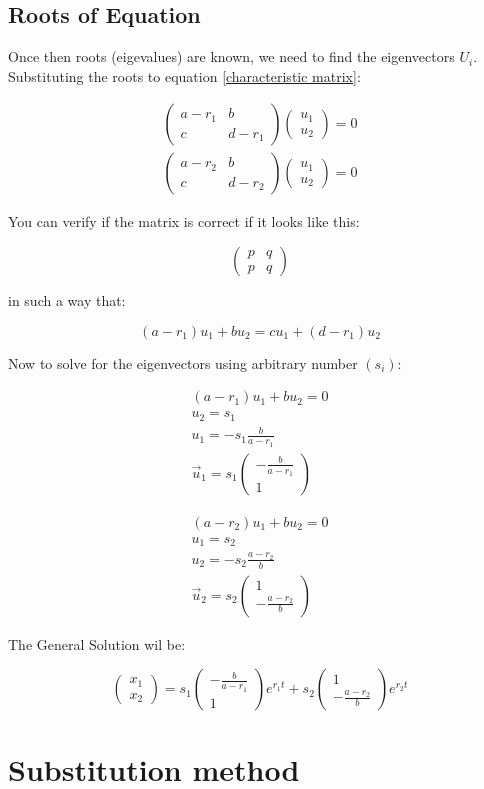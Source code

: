 \documentclass[12pt,letterpaper]{article}
\newcommand{\vectors}[2]{
	\begin{pmatrix}
		#1 \\ #2
	\end{pmatrix}
}
\newcommand{\smatrix}[4]{
	\begin{pmatrix}
		#1 & #2 \\ #3 & #4
	\end{pmatrix}
}
\begin{document}
		
		\subsection{Roots of Equation}

			Once then roots (eigevalues) are known, we need to find the eigenvectors $U_i$. Substituting the roots to equation \ref{characteristic matrix}:

			\begin{align*}
				\smatrix{a-r_1}{b}{c}{d-r_1} \vectors{u_1}{u_2} = 0 \\ 
				\smatrix{a-r_2}{b}{c}{d-r_2} \vectors{u_1}{u_2} = 0 
			\end{align*}

			You can verify if the matrix is correct if it looks like this:

			\begin{equation*}
				\smatrix{p}{q}{p}{q}
			\end{equation*}

			in such a way that:

			\begin{equation*}
				(a-r_1) u_1 + b u_2 = c u_1 + (d-r_1) u_2
			\end{equation*}

			Now to solve for the eigenvectors using arbitrary number $(s_i)$:

			\begin{align*}
				(a-r_1) u_1 + b u_2 = 0 \\
				u_2 = s_1 \\
				u_1  = -s_1 \frac{b}{a-r_1} \\
				\vec{u}_1 = s_1 \vectors{-\frac{b}{a-r_1}}{1}
			\end{align*}

			\begin{align*}
				(a-r_2) u_1 + b u_2 = 0 \\
				u_1 = s_2 \\
				u_2  = -s_2 \frac{a-r_2}{b} \\
				\vec{u}_2 = s_2 \vectors{1}{-\frac{a-r_2}{b}}
			\end{align*}

			The General Solution wil be:

			\begin{equation}
				\vectors{x_1}{x_2} = s_1 \vectors{-\frac{b}{a-r_1}}{1} e^{r_1 t} + s_2 \vectors{1}{-\frac{a-r_2}{b}} e^{r_2 t}
			\end{equation}

	\section{Substitution method}
\end{document}
